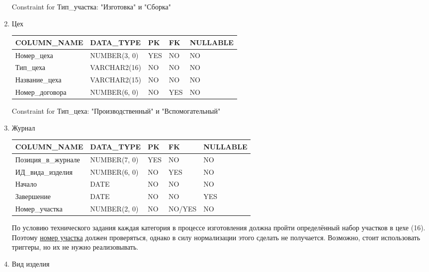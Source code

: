 \begin{enumerate}
\begin{tabular}{|p{4cm}|p{3cm}|p{1cm}|p{1cm}|p{2cm}|}
    \end{tabular}

    Constraint for Тип\_участка: "Изготовка" и "Сборка"

    \item{Цех}

    \begin{tabular}{|p{4cm}|p{3cm}|p{1cm}|p{1cm}|p{2cm}|} \hline

        {\bf COLUMN\_NAME} & {\bf DATA\_TYPE} & {\bf PK} & {\bf FK} & {\bf NULLABLE} \\ \hline
        Номер\_цеха & NUMBER(3, 0) & YES & NO & NO \\ \hline
        Тип\_цеха & VARCHAR2(16) & NO & NO & NO \\ \hline
        Название\_цеха & VARCHAR2(15) & NO & NO & NO \\ \hline
        Номер\_договора & NUMBER(6, 0) & NO & YES & NO \\ \hline

    \end{tabular}

    Constraint for Тип\_цеха: "Производственный" и "Вспомогательный"

    \item{Журнал}

    \begin{tabular}{|p{4cm}|p{3cm}|p{1cm}|p{1cm}|p{2cm}|} \hline

        {\bf COLUMN\_NAME} & {\bf DATA\_TYPE} & {\bf PK} & {\bf FK} & {\bf NULLABLE} \\ \hline
        Позиция\_в\_журнале & NUMBER(7, 0) & YES & NO & NO \\ \hline
        ИД\_вида\_изделия & NUMBER(6, 0) & NO & YES & NO \\ \hline
        Начало & DATE & NO & NO & NO \\ \hline
        Завершение & DATE & NO & NO & YES \\ \hline
        Номер\_участка & NUMBER(2, 0) & NO & NO/YES & NO

    \end{tabular}

    По условию технического задания каждая категория в процессе изготовления должна пройти определённый набор участков в цехе (16).
    Поэтому \underline{номер участка} должен проверяться, однако в силу нормализации этого сделать не получается.
    Возможно, стоит использовать триггеры, но их не нужно реализовывать.

    \item{Вид изделия}


\end{enumerate}

